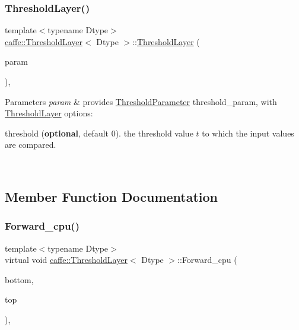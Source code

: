 \subsubsection{\texorpdfstring{Threshold\+Layer()}{ThresholdLayer()}\hspace{0.1cm}{\footnotesize\ttfamily [2/2]}}
{\footnotesize\ttfamily template$<$typename Dtype$>$ \\
\mbox{\hyperlink{classcaffe_1_1_threshold_layer}{caffe\+::\+Threshold\+Layer}}$<$ Dtype $>$\+::\mbox{\hyperlink{classcaffe_1_1_threshold_layer}{Threshold\+Layer}} (\begin{DoxyParamCaption}\item[{const \mbox{\hyperlink{classcaffe_1_1_layer_parameter}{Layer\+Parameter}} \&}]{param }\end{DoxyParamCaption})\hspace{0.3cm}{\ttfamily [inline]}, {\ttfamily [explicit]}}


\begin{DoxyParams}{Parameters}
{\em param} & provides \mbox{\hyperlink{classcaffe_1_1_threshold_parameter}{Threshold\+Parameter}} threshold\+\_\+param, with \mbox{\hyperlink{classcaffe_1_1_threshold_layer}{Threshold\+Layer}} options\+:
\begin{DoxyItemize}
\item threshold ({\bfseries optional}, default 0). the threshold value $ t $ to which the input values are compared. 
\end{DoxyItemize}\\
\hline
\end{DoxyParams}


\subsection{Member Function Documentation}
\mbox{\label{classcaffe_1_1_threshold_layer_ab4750bfabc48f7bc76721dec81a3d54f}} 
\subsubsection{\texorpdfstring{Forward\+\_\+cpu()}{Forward\_cpu()}\hspace{0.1cm}{\footnotesize\ttfamily [1/2]}}
{\footnotesize\ttfamily template$<$typename Dtype$>$ \\
virtual void \mbox{\hyperlink{classcaffe_1_1_threshold_layer}{caffe\+::\+Threshold\+Layer}}$<$ Dtype $>$\+::Forward\+\_\+cpu (\begin{DoxyParamCaption}\item[{const vector$<$ \mbox{\hyperlink{classcaffe_1_1_blob}{Blob}}$<$ Dtype $>$ $\ast$$>$ \&}]{bottom,  }\item[{const vector$<$ \mbox{\hyperlink{classcaffe_1_1_blob}{Blob}}$<$ Dtype $>$ $\ast$$>$ \&}]{top }\end{DoxyParamCaption})\hspace{0.3cm}{\ttfamily [protected]}, {\ttfamily [virtual]}}


